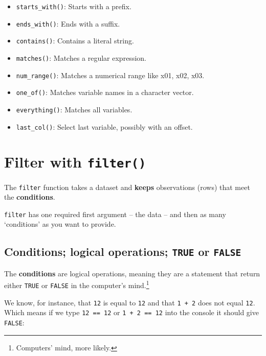 \documentclass[]{book}
\providecommand{\tightlist}{%
  \setlength{\itemsep}{0pt}\setlength{\parskip}{0pt}}
\begin{document}
\begin{itemize}
\tightlist
\item
  \texttt{starts\_with()}: Starts with a prefix.
\item
  \texttt{ends\_with()}: Ends with a suffix.
\item
  \texttt{contains()}: Contains a literal string.
\item
  \texttt{matches()}: Matches a regular expression.
\item
  \texttt{num\_range()}: Matches a numerical range like x01, x02, x03.
\item
  \texttt{one\_of()}: Matches variable names in a character vector.
\item
  \texttt{everything()}: Matches all variables.
\item
  \texttt{last\_col()}: Select last variable, possibly with an offset.
\end{itemize}

\hypertarget{filter-with-filter}{%
\section{\texorpdfstring{Filter with \texttt{filter()}}{Filter with filter()}}\label{filter-with-filter}}

The \texttt{filter} function takes a dataset and \textbf{keeps} observations (rows) that meet the \textbf{conditions}.

\texttt{filter} has one required first argument -- the data -- and then as many `conditions' as you want to provide.

\hypertarget{conditions-logical-operations-true-or-false}{%
\subsection{\texorpdfstring{Conditions; logical operations; \texttt{TRUE} or \texttt{FALSE}}{Conditions; logical operations; TRUE or FALSE}}\label{conditions-logical-operations-true-or-false}}

The \textbf{conditions} are logical operations, meaning they are a statement that return either \texttt{TRUE} or \texttt{FALSE} in the computer's mind.\footnote{Computers' mind, more likely.}

We know, for instance, that \texttt{12} is equal to \texttt{12} and that \texttt{1\ +\ 2} does not equal \texttt{12}. Which means if we type \texttt{12\ ==\ 12} or \texttt{1\ +\ 2\ ==\ 12} into the console it should give \texttt{FALSE}:
\end{document}
